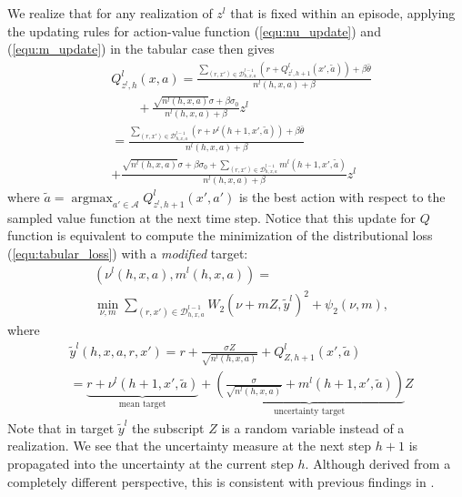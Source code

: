 \documentclass[letterpaper]{article} %
\newcommand{\Sp}[1]{\left(#1\right)}
\DeclareMathOperator*{\argmax}{argmax}
\theoremstyle{definition}
\begin{document}
We realize that for any realization of $z^l$ that is fixed within an episode, applying the updating rules for action-value function (\ref{equ:nu_update}) and (\ref{equ:m_update}) in the tabular case then gives
\fontsize{9}{9}
\begin{align*}
&Q^l_{z^l, h}\Sp{x, a}=\frac{\sum_{\Sp{r, x'}\in\mathcal{D}^{l-1}_{h, x, a}}\Sp{r+Q_{z^l, h+1}^l\Sp{x', \tilde{a}}}+\beta\bar{\theta}}{n^l\Sp{h, x, a}+\beta}\\
&\qquad+\frac{\sqrt{n^l\Sp{h, x, a}}\sigma+\beta\sigma_0}{n^l\Sp{h, x, a}+\beta}z^l\\
&=\frac{\sum_{\Sp{r, x'}\in\mathcal{D}^{l-1}_{h, x, a}}\Sp{r+\nu^l\Sp{h+1, x', \tilde{a}}}+\beta\bar{\theta}}{n^l\Sp{h, x, a}+\beta}\\
&+\frac{\sqrt{n^l\Sp{h, x, a}}\sigma+\beta\sigma_0+\sum_{\Sp{r, x'}\in\mathcal{D}^{l-1}_{h, x, a}}m^l\Sp{h+1, x', \tilde{a}}}{n^l\Sp{h, x, a}+\beta}z^l
\end{align*}
\normalsize
where $\tilde{a}=\argmax_{a'\in\mathcal{A}}Q^l_{z^l, h+1}\Sp{x', a'}$ is the best action with respect to the sampled value function at the next time step. Notice that this update for $Q$ function is equivalent to compute the minimization of the distributional loss (\ref{equ:tabular_loss}) with a \emph{modified} target:
\begin{align*}
&\Sp{\nu^l\Sp{h, x, a}, m^l\Sp{h, x, a}} = \\
&\min_{\nu, m} \sum_{\Sp{r, x'}\in\mathcal{D}^{l-1}_{h, x, a}} W_2\Sp{\nu + mZ, \tilde{y}^l}^2 + \psi_2\Sp{\nu, m},
\end{align*}
where
\fontsize{9}{9}
\begin{align*}
& \tilde{y}^l\Sp{h, x, a, r, x'} = r+\frac{\sigma Z}{\sqrt{n^l\Sp{h, x, a}}}+Q^l_{Z, h+1}\Sp{x', \tilde{a}} \\
& = \underbrace{r+ \nu^l(h+1, x', \tilde{a})}_{\text{mean target}} + \underbrace{(\frac{\sigma}{\sqrt{n^l\Sp{h, x, a}}}+ m^l(h+1, x', \tilde{a}))}_{\text{uncertainty target}}Z
\end{align*}
\normalsize
Note that in target $\tilde{y}^l$ the subscript $Z$ is a random variable instead of a realization. We see that the uncertainty measure at the next step $h+1$ is propagated into the uncertainty at the current step $h$. Although derived from a completely different perspective, this is consistent with previous findings in \cite{o2017uncertainty}.
\end{document}
